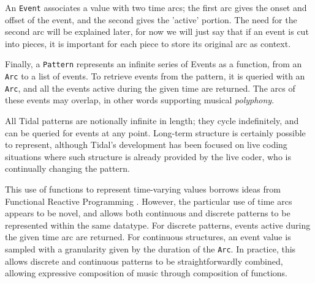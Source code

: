 \documentclass[authoryear]{sigplanconf}
\begin{document}

An \lstinline{Event} associates a value with two time arcs; the first
arc gives the onset and offset of the event, and the second gives the
'active' portion. The need for the second arc will be explained later,
for now we will just say that if an event is cut into pieces, it is
important for each piece to store its original arc as context.


Finally, a \lstinline{Pattern} represents an infinite series of Events
as a function, from an \lstinline{Arc} to a list of events. To
retrieve events from the pattern, it is queried with an
\lstinline{Arc}, and all the events active during the given time are
returned. The arcs of these events may overlap, in other words
supporting musical \emph{polyphony}.

All Tidal patterns are notionally infinite in length; they cycle
indefinitely, and can be queried for events at any point. Long-term
structure is certainly possible to represent, although Tidal's
development has been focused on live coding situations where such
structure is already provided by the live coder, who is continually
changing the pattern.


This use of functions to represent time-varying values borrows ideas
from Functional Reactive Programming \citep{Elliott09}. However, the
particular use of time arcs appears to be novel, and allows both
continuous and discrete patterns to be represented within the same
datatype. For discrete patterns, events active during the given time
arc are returned. For continuous structures, an event value is sampled
with a granularity given by the duration of the \lstinline{Arc}. In
practice, this allows discrete and continuous patterns to be
straightforwardly combined, allowing expressive composition of music
through composition of functions.
\end{document}

